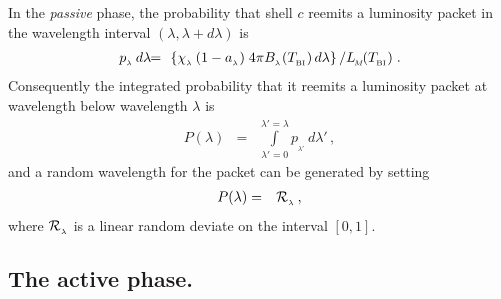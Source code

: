 \documentclass[usenatbib]{mn2e}
\numberwithin{equation}{section}
\begin{document}
In the {\it passive} phase, the probability that shell $c$ reemits a luminosity packet in the wavelength interval $(\lambda,\lambda+d\lambda)$ is
\begin{eqnarray}
p_{_\lambda}\,d\lambda\!&\!=\!&\!\left\{\chi_{_\lambda}\,(1-a_{_\lambda})\;4\pi B_{_\lambda}(T_{_{\rm BI}})\,d\lambda\right\}\left/L_{_{\!M}}\!(T_{_{\rm BI}})\right..
\end{eqnarray}
Consequently the integrated probability that it reemits a luminosity packet at wavelength below wavelength $\lambda$ is
\begin{eqnarray}
P(\lambda)&=&\int\limits_{\lambda'=0}^{\lambda'=\lambda}p_{_{\lambda'}}\,d\lambda'\,,
\end{eqnarray}
and a random wavelength for the packet can be generated by setting 
\begin{eqnarray}
P(\lambda)&=&{\cal R}_{_\lambda}\,,
\end{eqnarray}
where ${\cal R}_{_\lambda}$ is a linear random deviate on the interval $[0,1]$.

\vspace{0.5cm}





\subsection{The active phase.}
\end{document}
